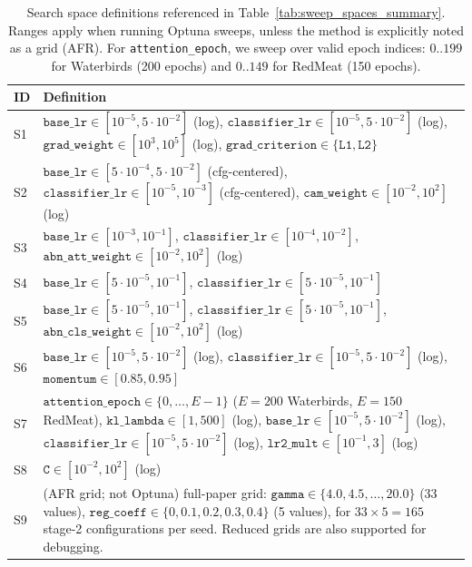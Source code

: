 \documentclass[10pt,twocolumn,letterpaper]{article}
\begin{document}
\begin{table}[!ht]
\centering
\caption{Search space definitions referenced in Table~\ref{tab:sweep_spaces_summary}. Ranges apply when running Optuna sweeps, unless the method is explicitly noted as a grid (AFR). For \texttt{attention\_epoch}, we sweep over valid epoch indices: $0..199$ for Waterbirds (200 epochs) and $0..149$ for RedMeat (150 epochs).}
\label{tab:sweep_spaces_def}
\scriptsize
\setlength{\tabcolsep}{3pt}
\renewcommand{\arraystretch}{1.15}
\begin{tabularx}{\linewidth}{l X}
\toprule
\textbf{ID} & \textbf{Definition} \\
\midrule
S1 & $\texttt{base\_lr}\in[10^{-5},5\cdot10^{-2}]$ (log), $\texttt{classifier\_lr}\in[10^{-5},5\cdot10^{-2}]$ (log), $\texttt{grad\_weight}\in[10^{3},10^{5}]$ (log), $\texttt{grad\_criterion}\in\{\texttt{L1},\texttt{L2}\}$ \\
S2 & $\texttt{base\_lr}\in[5\cdot10^{-4},5\cdot10^{-2}]$ (cfg-centered), $\texttt{classifier\_lr}\in[10^{-5},10^{-3}]$ (cfg-centered), $\texttt{cam\_weight}\in[10^{-2},10^{2}]$ (log) \\
S3 & $\texttt{base\_lr}\in[10^{-3},10^{-1}]$, $\texttt{classifier\_lr}\in[10^{-4},10^{-2}]$, $\texttt{abn\_att\_weight}\in[10^{-2},10^{2}]$ (log) \\
S4 & $\texttt{base\_lr}\in[5\cdot10^{-5},10^{-1}]$, $\texttt{classifier\_lr}\in[5\cdot10^{-5},10^{-1}]$ \\
S5 & $\texttt{base\_lr}\in[5\cdot10^{-5},10^{-1}]$, $\texttt{classifier\_lr}\in[5\cdot10^{-5},10^{-1}]$, $\texttt{abn\_cls\_weight}\in[10^{-2},10^{2}]$ (log) \\
S6 & $\texttt{base\_lr}\in[10^{-5},5\cdot10^{-2}]$ (log), $\texttt{classifier\_lr}\in[10^{-5},5\cdot10^{-2}]$ (log), $\texttt{momentum}\in[0.85,0.95]$ \\
S7 & $\texttt{attention\_epoch}\in\{0,\dots,E-1\}$ ($E{=}200$ Waterbirds, $E{=}150$ RedMeat), $\texttt{kl\_lambda}\in[1,500]$ (log), $\texttt{base\_lr}\in[10^{-5},5\cdot10^{-2}]$ (log), $\texttt{classifier\_lr}\in[10^{-5},5\cdot10^{-2}]$ (log), $\texttt{lr2\_mult}\in[10^{-1},3]$ (log) \\
S8 & $\texttt{C}\in[10^{-2},10^{2}]$ (log) \\
S9 & (AFR grid; not Optuna) full-paper grid: $\texttt{gamma}\in\{4.0,4.5,\dots,20.0\}$ (33 values), $\texttt{reg\_coeff}\in\{0,0.1,0.2,0.3,0.4\}$ (5 values), for $33\times5=165$ stage-2 configurations per seed. Reduced grids are also supported for debugging. \\
\bottomrule
\end{tabularx}
\end{table}
\FloatBarrier
\end{document}
